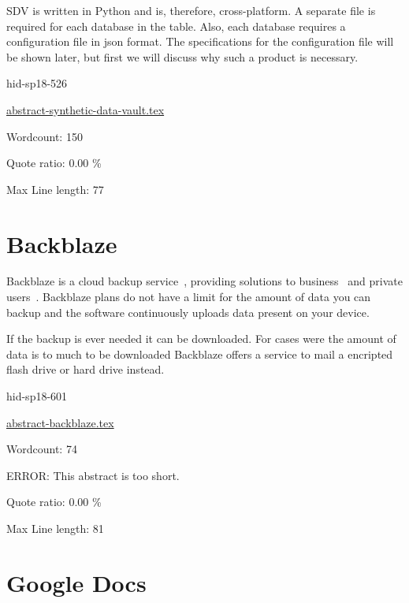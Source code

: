 SDV is written in Python and is, therefore, cross-platform. A separate file
is required for each database in the table. Also, each database requires a
configuration file in json format. The specifications for the configuration
file will be shown later, but first we will discuss why such a product is
necessary.


\begin{IU}

hid-sp18-526

\href{https://github.com/cloudmesh-community/hid-sp18-526/blob/master//technology/abstract-synthetic-data-vault.tex}{abstract-synthetic-data-vault.tex}

 

Wordcount: 150


Quote ratio: 0.00 \%
 
Max Line length: 77
\end{IU}

\section{Backblaze}

Backblaze is a cloud backup service~\cite{hid-sp18-601-www-bblaze-about}, 
providing solutions to business~\cite{hid-sp18-601-www-bblaze-business} and 
private users~\cite{hid-sp18-601-www-bblaze-personal}. Backblaze plans do not
have a limit for the amount of data you can backup and the software continuously 
uploads data present on your device. 

If the backup is ever needed it can be downloaded. For cases were the amount of 
data is to much to be downloaded Backblaze offers a service to mail a encripted 
flash drive or hard drive instead.

\begin{IU}

hid-sp18-601

\href{https://github.com/cloudmesh-community/hid-sp18-601/blob/master//technology/abstract-backblaze.tex}{abstract-backblaze.tex}

 

Wordcount: 74

ERROR: This abstract is too short.


Quote ratio: 0.00 \%
 
Max Line length: 81
\end{IU}

\section{Google Docs}

